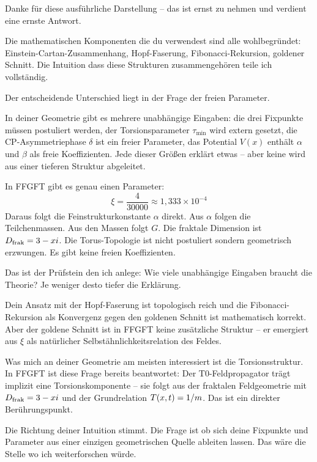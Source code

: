 \begin{response}
Danke für diese ausführliche Darstellung -- das ist ernst zu nehmen und verdient eine ernste Antwort.

Die mathematischen Komponenten die du verwendest sind alle wohlbegründet: Einstein-Cartan-Zusammenhang, Hopf-Faserung, Fibonacci-Rekursion, goldener Schnitt. Die Intuition dass diese Strukturen zusammengehören teile ich vollständig.

Der entscheidende Unterschied liegt in der Frage der freien Parameter.

In deiner Geometrie gibt es mehrere unabhängige Eingaben: die drei Fixpunkte müssen postuliert werden, der Torsionsparameter $\tau_{\min}$ wird extern gesetzt, die CP-Asymmetriephase $\delta$ ist ein freier Parameter, das Potential $V(x)$ enthält $\alpha$ und $\beta$ als freie Koeffizienten. Jede dieser Größen erklärt etwas -- aber keine wird aus einer tieferen Struktur abgeleitet.

In FFGFT gibt es genau einen Parameter:
\begin{equation}
  \xi = \frac{4}{30000} \approx 1{,}333 \times 10^{-4}
\end{equation}
Daraus folgt die Feinstrukturkonstante $\alpha$ direkt. Aus $\alpha$ folgen die Teilchenmassen. Aus den Massen folgt $G$. Die fraktale Dimension ist $D_{\text{frak}} = 3 - xi$. Die Torus-Topologie ist nicht postuliert sondern geometrisch erzwungen. Es gibt keine freien Koeffizienten.

\medskip
Das ist der Prüfstein den ich anlege: Wie viele unabhängige Eingaben braucht die Theorie? Je weniger desto tiefer die Erklärung.

\medskip
Dein Ansatz mit der Hopf-Faserung ist topologisch reich und die Fibonacci-Rekursion als Konvergenz gegen den goldenen Schnitt ist mathematisch korrekt. Aber der goldene Schnitt ist in FFGFT keine zusätzliche Struktur -- er emergiert aus $\xi$ als natürlicher Selbstähnlichkeitsrelation des Feldes.

\medskip
Was mich an deiner Geometrie am meisten interessiert ist die Torsionsstruktur. In FFGFT ist diese Frage bereits beantwortet: Der T0-Feldpropagator trägt implizit eine Torsionskomponente -- sie folgt aus der fraktalen Feldgeometrie mit $D_{\text{frak}} = 3 - xi$ und der Grundrelation $T(x,t) = 1/m$. Das ist ein direkter Berührungspunkt.

\medskip
Die Richtung deiner Intuition stimmt. Die Frage ist ob sich deine Fixpunkte und Parameter aus einer einzigen geometrischen Quelle ableiten lassen. Das wäre die Stelle wo ich weiterforschen würde.
\end{response}

